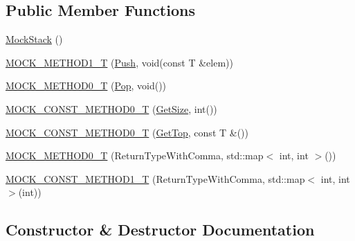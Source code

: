 \subsection*{Public Member Functions}
\begin{DoxyCompactItemize}
\item 
\hyperlink{classtesting_1_1gmock__generated__function__mockers__test_1_1_mock_stack_aa8a3df8e1cbc95836663acd99c3e9d37}{Mock\+Stack} ()
\item 
\hyperlink{classtesting_1_1gmock__generated__function__mockers__test_1_1_mock_stack_a0ad833bc6134c5150b8271a5ba2e91b5}{M\+O\+C\+K\+\_\+\+M\+E\+T\+H\+O\+D1\+\_\+T} (\hyperlink{classtesting_1_1gmock__generated__function__mockers__test_1_1_stack_interface_a49448f6195021fee947d37b80b6e5d30}{Push}, void(const T \&elem))
\item 
\hyperlink{classtesting_1_1gmock__generated__function__mockers__test_1_1_mock_stack_a5e55ffb22e7f11c6940a97bd001bd50c}{M\+O\+C\+K\+\_\+\+M\+E\+T\+H\+O\+D0\+\_\+T} (\hyperlink{classtesting_1_1gmock__generated__function__mockers__test_1_1_stack_interface_a1a6646d1d9febe90c607b9b3e4539b67}{Pop}, void())
\item 
\hyperlink{classtesting_1_1gmock__generated__function__mockers__test_1_1_mock_stack_a6171be20e8e4f44464cc8968e05b7c7a}{M\+O\+C\+K\+\_\+\+C\+O\+N\+S\+T\+\_\+\+M\+E\+T\+H\+O\+D0\+\_\+T} (\hyperlink{classtesting_1_1gmock__generated__function__mockers__test_1_1_stack_interface_a537ec8647a2333f50e5f923a85b90eba}{Get\+Size}, int())
\item 
\hyperlink{classtesting_1_1gmock__generated__function__mockers__test_1_1_mock_stack_ae5950cfac08382a0ffc7c3bd5aba405f}{M\+O\+C\+K\+\_\+\+C\+O\+N\+S\+T\+\_\+\+M\+E\+T\+H\+O\+D0\+\_\+T} (\hyperlink{classtesting_1_1gmock__generated__function__mockers__test_1_1_stack_interface_af36e32b9ae568100363466d1ebf95364}{Get\+Top}, const T \&())
\item 
\hyperlink{classtesting_1_1gmock__generated__function__mockers__test_1_1_mock_stack_a4b67d1f5b795e7c072fb846217a8f130}{M\+O\+C\+K\+\_\+\+M\+E\+T\+H\+O\+D0\+\_\+T} (Return\+Type\+With\+Comma, std\+::map$<$ int, int $>$())
\item 
\hyperlink{classtesting_1_1gmock__generated__function__mockers__test_1_1_mock_stack_a69b9a7d0231b729d8a47201a49fa9166}{M\+O\+C\+K\+\_\+\+C\+O\+N\+S\+T\+\_\+\+M\+E\+T\+H\+O\+D1\+\_\+T} (Return\+Type\+With\+Comma, std\+::map$<$ int, int $>$(int))
\end{DoxyCompactItemize}


\subsection{Constructor \& Destructor Documentation}
